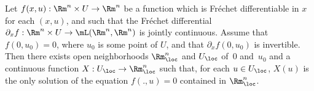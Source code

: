 \begin{lem}
Let $f(x,u):\Rm^n\times U\to \Rm^n$ be a function which is Fréchet differentiable in $x$ for each $(x,u)$, and such that
the Fréchet differential $\partial_xf:\Rm^n\times U\to \mL(\Rm^n,\Rm^n)$ is jointly continuous. Assume that $f(0,u_0)=0$, where $u_0$ is some point of $U$, and that $\partial_x f(0,u_0)$ is invertible. Then there exists open neighborhoods $\Rm^n_{\loc}$ and $U_{\loc}$ of~$0$ and~$u_0$ and a continuous function $X: U_{\loc}\to \Rm^n_{\loc}$ such that, for each $u\in U_{\loc}$,
$X(u)$ is the only solution of the equation $f(.,u)=0$ contained in $\Rm^n_{\loc}$.
\end{lem}

